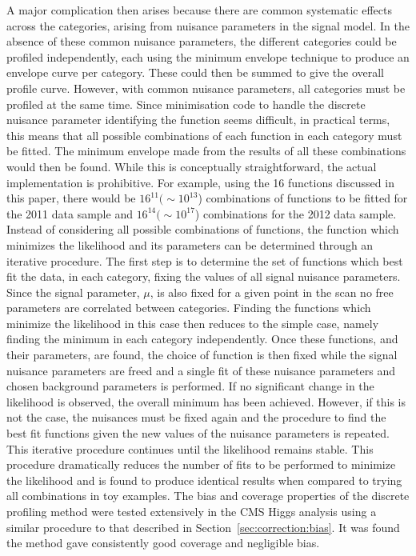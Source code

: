 A major complication then arises because there are common systematic effects
across the categories, arising from nuisance parameters in the signal
model.
In the absence of these common nuisance parameters,
the different categories could be profiled independently, each using the
minimum envelope technique to produce an envelope curve per category.
These could then
be summed to give the overall profile curve. However, with common
nuisance parameters, all categories must be profiled at the same time.
Since minimisation code to handle the 
discrete nuisance parameter identifying the
function seems difficult, in practical terms, this means that all possible
combinations of each function in each category must be fitted.
The minimum envelope made from the results of all these combinations would
then be found. While this is conceptually straightforward, the actual
implementation is prohibitive. For example, using the 16 functions
discussed in this paper, there would be $16^{11} (\sim 10^{13}$) combinations 
of functions to be fitted for the 2011 data sample and $16^{14} (\sim 10^{17}$)
combinations for the 2012 data sample.
Instead of considering all possible combinations of functions, the function 
which minimizes the likelihood and its parameters can be determined through 
an iterative procedure. The first step is to determine the set of functions 
which best fit the data, in each category, fixing the values of all 
signal nuisance parameters.
Since the signal parameter, $\mu$, is also fixed for a given point in the scan 
no free parameters are correlated between categories.
Finding the functions which minimize the likelihood in 
this case then reduces to the simple case, namely finding the minimum in each 
category independently. 
Once these functions, and their parameters, are found, the choice of function 
is then fixed while the signal nuisance parameters are freed and a 
single fit of these
nuisance parameters and chosen background parameters is performed.
If no significant change in the likelihood is observed, the overall minimum
has been 
achieved. However, if this is not the case, the nuisances must be fixed again 
and the procedure to find the best fit functions given the new values of the 
nuisance parameters is repeated.
This iterative procedure continues until the likelihood remains stable.
This procedure dramatically reduces the number of fits to be performed 
to minimize the likelihood and is found to produce identical results when 
compared to trying all combinations in toy examples. 
The bias and coverage properties of the discrete profiling method were tested 
extensively in the CMS Higgs analysis using a similar procedure to that described in 
Section~\ref{sec:correction:bias}. It was found the method gave consistently good 
coverage and negligible bias.






